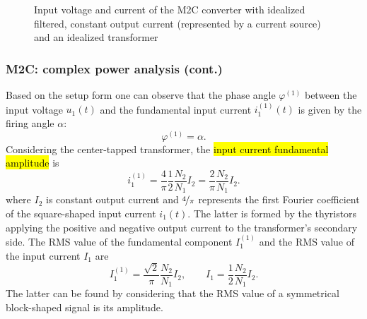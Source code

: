 \begin{frame}[c]
\begin{figure}
     \caption{Input voltage and current of the M2C converter with idealized filtered, constant output current (represented by a current source) and an idealized transformer}
     \label{fig:M2C_inputs}
 \end{figure}
\end{frame}

\begin{frame}[c]
    \frametitle{M2C: complex power analysis (cont.)}
    Based on the setup form  one can observe that the phase angle $\varphi^{(1)}$ between the input voltage $u_1(t)$ and the fundamental input current $i^{(1)}_1(t)$ is given by the firing angle $\alpha$:
    $$
    \varphi^{(1)} = \alpha.
    $$
    Considering the center-tapped transformer, the \hl{input current fundamental amplitude} is
    \begin{equation}
        i^{(1)}_1 = \frac{4}{\pi} \frac{1}{2}\frac{N_2}{N_1} I_2 = \frac{2}{\pi} \frac{N_2}{N_1} I_2.
    \end{equation}
    where $I_2$ is constant output current and $\nicefrac{4}{\pi}$ represents the first Fourier coefficient of the square-shaped input current $i_1(t)$. The latter is formed by the thyristors applying the positive and negative output current to the transformer's secondary side. The RMS value of the fundamental component $I^{(1)}_1$ and the RMS value of the input current $I_1$ are
    \begin{equation}
        I^{(1)}_1 = \frac{\sqrt{2}}{\pi} \frac{N_2}{N_1} I_2, \qquad I_1 = \frac{1}{2}\frac{N_2}{N_1} I_2.
    \end{equation}
    The latter can be found by considering that the RMS value of a symmetrical block-shaped signal is its amplitude.
\end{frame}


